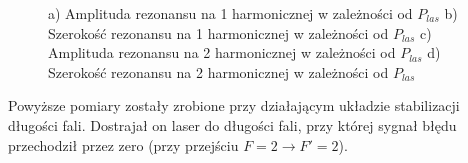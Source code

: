 \documentclass[a4paper,10pt,twoside]{report}
\begin{document}

\begin{figure}[h!]
\centering
{}

\caption{ a) Amplituda rezonansu na 1 harmonicznej w zależności od $P_{las}$ b) Szerokość rezonansu na 1 harmonicznej w zależności od $P_{las}$ 
c) Amplituda rezonansu na 2 harmonicznej w zależności od $P_{las}$ d) Szerokość rezonansu na 2 harmonicznej w zależności od $P_{las}$}
\label{wykresikiodP}
\end{figure}

Powyższe pomiary zostały zrobione przy działającym układzie stabilizacji długości fali. Dostrajał on laser do długości fali, przy której sygnał błędu przechodził przez zero (przy przejściu $F=2 \rightarrow F'=2$).
\end{document}
